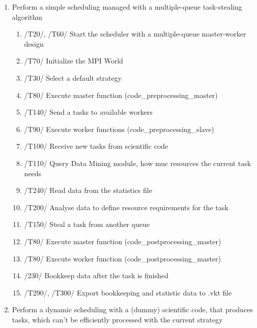 {\begin{enumerate}
			\item Perform a simple scheduling managed with a multiple-queue task-stealing algorithm
				\begin{enumerate}
				
				\item /T20/, /T60/ Start the scheduler with a multiple-queue master-worker design
				\item /T70/ Initialize the MPI World
				\item /T30/ Select a default strategy
				\item /T80/ Execute master function (code\_preprocessing\_master)
				\item /T140/ Send a tasks to available workers
				\item /T90/ Execute worker functions (code\_preprocessing\_slave)
				\item /T100/ Receive new tasks from scientific code
				\item /T110/ Query Data Mining module, how muc resources the current task needs
				\item /T240/ Read data from the statistics file
				\item /T200/ Analyse data to define resource requirements for the task
				\item /T150/ Steal a task from another queue
				\item /T80/ Execute master function (code\_postprocessing\_master)
				\item /T80/ Execute worker function (code\_postprocessing\_master)
				\item /230/ Bookkeep data after the task is finished
				\item /T290/, /T300/ Export bookkeeping and statistic data to .vkt file
				
				\end{enumerate}
			
			\item Perform a dynamic scheduling with a (dummy) scientific code, that produces tasks, which can't be efficiently processed with the current strategy 
				

\end{enumerate}}
